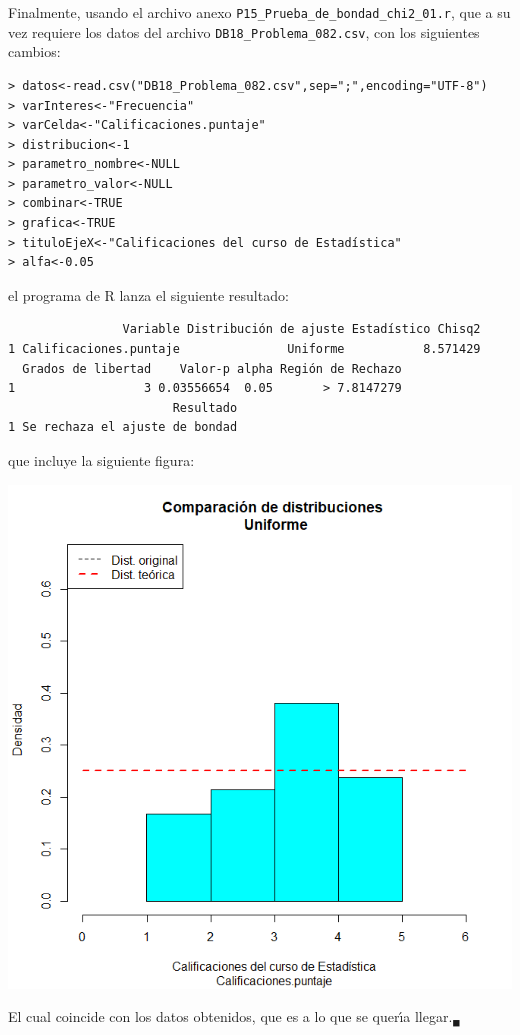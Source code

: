 \begin{solucion}
 Finalmente, usando el archivo anexo
 \texttt{P15\_Prueba\_de\_bondad\_chi2\_01.r},
 que a su vez requiere los datos del archivo
 \texttt{DB18\_Problema\_082.csv}, con los siguientes cambios:
 \begin{verbatim}
> datos<-read.csv("DB18_Problema_082.csv",sep=";",encoding="UTF-8")
> varInteres<-"Frecuencia"
> varCelda<-"Calificaciones.puntaje"
> distribucion<-1
> parametro_nombre<-NULL
> parametro_valor<-NULL
> combinar<-TRUE
> grafica<-TRUE
> tituloEjeX<-"Calificaciones del curso de Estadística"
> alfa<-0.05
 \end{verbatim}
 \vspace{-0.5cm}
 el programa de R lanza el siguiente resultado:
 \begin{verbatim}
                Variable Distribución de ajuste Estadístico Chisq2
1 Calificaciones.puntaje               Uniforme           8.571429
  Grados de libertad    Valor-p alpha Región de Rechazo
1                  3 0.03556654  0.05       > 7.8147279
                       Resultado
1 Se rechaza el ajuste de bondad
 \end{verbatim}
 \vspace{-0.5cm}
 que incluye la siguiente figura:
 \begin{center}
  \includegraphics[scale=0.4]{Problema_82.png}
 \end{center}
 El cual coincide con los datos obtenidos,
 que es a lo que se quer\'{\i}a llegar.${}_{\blacksquare}$
\end{solucion}
